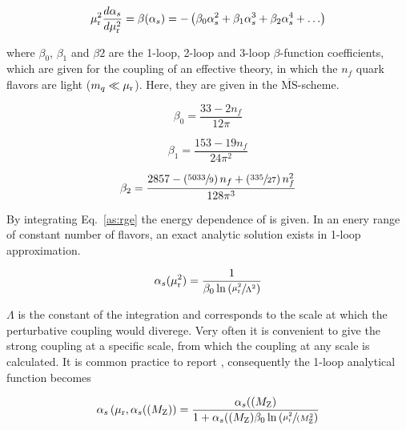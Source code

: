 \begin{equation}
    \mu_{\mathrm{r}}^2 \frac{d \alpha_{s}}{d \mu_{\mathrm{r}}^2} = \beta(\alpha_{s}) = - \left( \beta_0 \alpha_{s}^2 + \beta_1 \alpha_{s}^3
    + \beta_2 \alpha_{s}^4 + \ldots \right)
    \label{eq:as_rge}
\end{equation}

where $\beta_0$, $\beta_1$ and $\beta 2$ are the 1-loop, 2-loop and 3-loop 
$\beta$-function coefficients, which are given for the coupling of an effective
theory, in which the $n_f$ quark flavors are light ($m_q \ll \mu_{\mathrm{r}}$). Here, they
are given in the $\overline{\mathrm{MS}}$-scheme.

\begin{equation} 
    \beta_0 = \frac{33 - 2 n_f}{12\pi}
\end{equation}

\begin{equation} 
    \beta_1 = \frac{153 - 19 n_f}{24\pi^2}
\end{equation}

\begin{equation} 
   \beta_2 = \frac{2857 -\left(\sfrac{5033}{9}\right)n_f + \left(\sfrac{335}{27}
   \right)n_f^2}{128 \pi^3}
\end{equation}

By integrating Eq.~\ref{as:rge} the energy dependence of \as is given. In an
enery range of constant number of flavors, an exact analytic solution exists in
1-loop approximation. 

\begin{equation*}
   \alpha_{s}(\mu_{\mathrm{r}}^2) = \frac{1}{\beta_0 \ln \left( \sfrac{\mu_{\mathrm{r}}^2}{\Lambda^2} \right)}
\end{equation*}

$\Lambda$ is the constant of the integration and corresponds to the scale at
which the perturbative coupling would diverege. Very often it is convenient to
give the strong coupling at a specific scale, from which the coupling at any
scale is calculated. It is common practice to report \asmz, consequently the
1-loop analytical function becomes

\begin{equation*}
   \alpha_{s}\left(\mu_{\mathrm{r}}, \alpha_{s}((M_\mathrm{Z})\right) = \frac{\alpha_{s}((M_\mathrm{Z})}{1 + \alpha_{s}((M_\mathrm{Z})\beta_0 \ln
       \left( \sfrac{\mu_{\mathrm{r}}^2}{(M_\mathrm{Z}^2} \right)}
\end{equation*}

